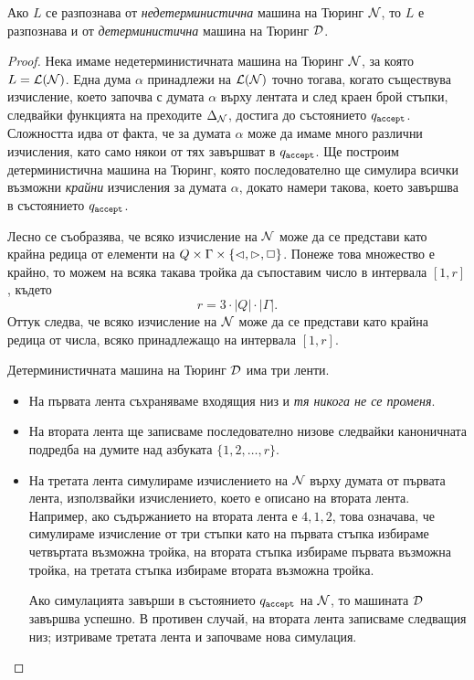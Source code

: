 \begin{framed}
  \begin{thm}
    Ако $L$ се разпознава от {\em недетерминистична} машина на Тюринг $\mathcal{N}$, то $L$
    е разпознава и от {\em детерминистична} машина на Тюринг $\mathcal{D}$.
  \end{thm}
\end{framed}
\begin{proof}
  Нека имаме недетерминистичната машина на Тюринг $\mathcal{N}$, за която $L = \mathcal{L}(\mathcal{N})$.
  Една дума $\alpha$ принадлежи на $\mathcal{L}(\mathcal{N})$ точно тогава, когато съществува изчисление,
  което започва с думата $\alpha$ върху лентата и след краен брой стъпки, следвайки функцията на преходите $\Delta_{\mathcal{N}}$,
  достига до състоянието $q_{\texttt{accept}}$.
  Сложността идва от факта, че за думата $\alpha$ може да имаме много различни изчисления, 
  като само някои от тях завършват в $q_{\texttt{accept}}$. Ще построим детерминистична машина на Тюринг,
  която последователно ще симулира всички възможни {\em крайни} изчисления за думата $\alpha$, докато 
  намери такова, което завършва в състоянието $q_{\texttt{accept}}$.
  
  Лесно се съобразява, че всяко изчисление на $\mathcal{N}$ може да се представи като 
  крайна редица от елементи на $Q \times \Gamma \times \{\lhd,\rhd,\Box\}$.
  Понеже това множество е крайно, то можем на всяка такава тройка да
  съпоставим число в интервала $[1,r]$, където 
  \[r = 3\cdot|Q| \cdot |\Gamma|.\]
  Оттук следва, че всяко изчисление на $\mathcal{N}$ може да се представи като крайна 
  редица от числа, всяко принадлежащо на интервала $[1,r]$.

  Детерминистичната машина на Тюринг $\mathcal{D}$ има три ленти.
  
  \begin{itemize}
  \item 
    На първата лента съхраняваме входящия низ и {\em тя никога не се променя}.
  \item
    На втората лента ще записваме последователно низове следвайки каноничната подредба на 
    думите над азбуката $\{1,2,\dots,r\}$.
  \item
    На третата лента симулираме изчислението на $\mathcal{N}$ върху думата от първата лента, използвайки изчислението, 
    което е описано на втората лента. Например, ако съдържанието на втората лента е $4,1,2$,
    това означава, че симулираме изчисление от три стъпки като на първата стъпка избираме четвъртата
    възможна тройка, на втората стъпка избираме първата възможна тройка, на третата стъпка избираме втората възможна тройка.
    
    Ако симулацията завърши в състоянието $q_{\texttt{accept}}$ на $\mathcal{N}$, то машината $\mathcal{D}$ завършва успешно.
    В противен случай, на втората лента записваме следващия низ; изтриваме третата лента и започваме нова симулация.
  \end{itemize}
\end{proof}

